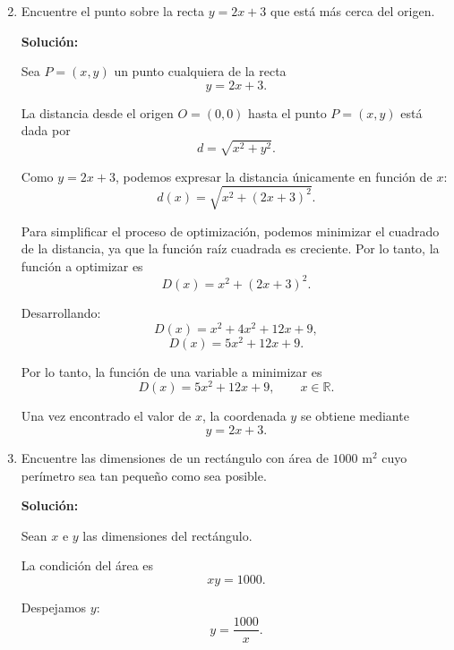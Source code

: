 \documentclass[12pt]{article}
\newcommand{\solucion}{%
    \vspace{0.8em}%
    \textbf{Solución:}%
}
\begin{document}
\begin{enumerate}[label=\alph*.-]

    \setcounter{enumi}{1} %


    \item Encuentre el punto sobre la recta $y = 2x + 3$ que está más cerca del origen.

    \solucion

    Sea $P=(x,y)$ un punto cualquiera de la recta
    \[
    y=2x+3.
    \]

    La distancia desde el origen $O=(0,0)$ hasta el punto $P=(x,y)$
    está dada por
    \[
    d=\sqrt{x^2+y^2}.
    \]

    Como $y=2x+3$, podemos expresar la distancia únicamente en función
    de $x$:
    \[
    d(x)=\sqrt{x^2+(2x+3)^2}.
    \]

    Para simplificar el proceso de optimización, podemos minimizar el
    cuadrado de la distancia, ya que la función raíz cuadrada es
    creciente. Por lo tanto, la función a optimizar es
    \[
    D(x)=x^2+(2x+3)^2.
    \]

    Desarrollando:
    \[
    D(x)=x^2+4x^2+12x+9,
    \]
    \[
    \boxed{D(x)=5x^2+12x+9}.
    \]

    Por lo tanto, la función de una variable a minimizar es
    \[
    \boxed{D(x)=5x^2+12x+9},
    \qquad x\in\mathbb{R}.
    \]

    Una vez encontrado el valor de $x$, la coordenada $y$ se obtiene
    mediante
    \[
    y=2x+3.
    \]


    \vspace{1cm}

				\newpage

    \item Encuentre las dimensiones de un rectángulo con área de
    $1000 \text{ m}^2$ cuyo perímetro sea tan pequeño como sea posible.

    \solucion

    Sean $x$ e $y$ las dimensiones del rectángulo.

    La condición del área es
    \[
    xy=1000.
    \]

    Despejamos $y$:
    \[
    y=\frac{1000}{x}.
    \]


\end{enumerate}
\end{document}
